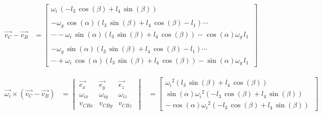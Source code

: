 \begin{equation*}
\begin{split}
\overrightarrow{v_{C}}-\overrightarrow{v_{B}}
&=	\begin{bmatrix}
	\omega_{i}\, \left( -l_{3}\,\cos \left( \beta \right) +l_{4}\,\sin \left( \beta \right)  \right)\\
	\\
	-\omega_{g}\,\cos\left( \alpha \right)  \left( l_{3}\,\sin \left( \beta \right) +l_{4}\,\cos \left( \beta \right) -l_{1} \right)\cdots\\
	\cdots -\omega_{i}\,\sin \left( \alpha \right)  \left( l_{3}\,\sin \left( \beta \right) +l_{4}\,\cos\left( \beta \right)  \right) -\cos \left( \alpha \right) \omega_{g}\,l_{1}\\
	\\
	-\omega_{g}\,\sin \left( \alpha \right) \left( l_{3}\,\sin \left( \beta \right) +l_{4}\,\cos \left( \beta\right) -l_{1} \right)\cdots\\
	\cdots +\omega_{i}\,\cos \left( \alpha \right) \left( l_{3}\,\sin \left( \beta \right) +l_{4}\,\cos \left( \beta\right)  \right) -\sin \left( \alpha \right) \omega_{g}\,l_{1}\
	\end{bmatrix}
\end{split}
\end{equation*}

\begin{equation*}
\begin{split}
\overrightarrow{\omega_{i}}\times(\overrightarrow{v_{C}}-\overrightarrow{v_{B}})
&=	\begin{vmatrix}
	\overrightarrow{e_{x}} & \overrightarrow{e_{y}} & \overrightarrow{e_{z}}\\
	\omega_{ix} & \omega_{iy} & \omega_{iz}\\
	v_{CBx} & v_{CBy} & v_{CBz}\
	\end{vmatrix}
&=	\begin{bmatrix}
	{\omega_{i}}^{2} \left( l_{3}\,\sin \left( 
\beta \right) +l_{4}\,\cos \left( \beta \right)  \right)\\ 
	\sin \left( \alpha \right) {\omega_{i}}^{2}
\left( -l_{3}\,\cos \left( \beta \right) +l_{4}\,\sin \left( \beta
\right)  \right)\\
	-\cos \left( \alpha \right) {
\omega_{i}}^{2} \left( -l_{3}\,\cos \left( \beta \right) +l_{4}\,\sin
\left( \beta \right)  \right) \
	\end{bmatrix}
\end{split}
\end{equation*}

